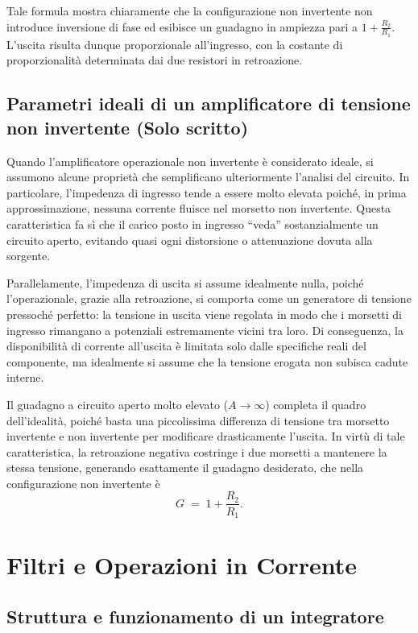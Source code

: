 Tale formula mostra chiaramente che la configurazione non invertente non introduce inversione di fase ed esibisce un guadagno in ampiezza pari a \(1 + \tfrac{R_{2}}{R_{1}}\). L’uscita risulta dunque proporzionale all’ingresso, con la costante di proporzionalità determinata dai due resistori in retroazione.
\newpage

\subsection{Parametri ideali di un amplificatore di tensione non invertente (Solo scritto)}

Quando l’amplificatore operazionale non invertente è considerato ideale, si assumono alcune proprietà che semplificano ulteriormente l’analisi del circuito. In particolare, l’impedenza di ingresso tende a essere molto elevata poiché, in prima approssimazione, nessuna corrente fluisce nel morsetto non invertente. Questa caratteristica fa sì che il carico posto in ingresso “veda” sostanzialmente un circuito aperto, evitando quasi ogni distorsione o attenuazione dovuta alla sorgente.

Parallelamente, l’impedenza di uscita si assume idealmente nulla, poiché l’operazionale, grazie alla retroazione, si comporta come un generatore di tensione pressoché perfetto: la tensione in uscita viene regolata in modo che i morsetti di ingresso rimangano a potenziali estremamente vicini tra loro. Di conseguenza, la disponibilità di corrente all’uscita è limitata solo dalle specifiche reali del componente, ma idealmente si assume che la tensione erogata non subisca cadute interne.

Il guadagno a circuito aperto molto elevato (\(A \rightarrow \infty\)) completa il quadro dell’idealità, poiché basta una piccolissima differenza di tensione tra morsetto invertente e non invertente per modificare drasticamente l’uscita. In virtù di tale caratteristica, la retroazione negativa costringe i due morsetti a mantenere la stessa tensione, generando esattamente il guadagno desiderato, che nella configurazione non invertente è
\[
    G \;=\; 1 + \frac{R_{2}}{R_{1}}.
\]

\newpage
\section{Filtri e Operazioni in Corrente}

\subsection{Struttura e funzionamento di un integratore}

